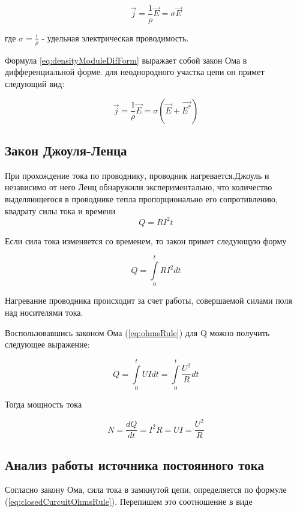 \documentclass[14pt, a4paper, twoside]{extreport}
\begin{document}
\begin{equation}
  \label{eq:densityVectorDifForm}
  \vec{j} = \frac{1}{\rho}\vec{E} = \sigma\vec{E}
\end{equation}

где $\sigma = \frac{1}{\rho}$ - удельная электрическая проводимость.

Формула \ref{eq:densityModuleDifForm} выражает собой закон Ома в дифференциальной форме. для неоднородного участка цепи он примет следующий вид:

\begin{equation}
  \label{eq:densityVectorDifFormInisotropicConductor}
  \vec{j} = \frac{1}{\rho}\vec{E} = \sigma(\vec{E} + \vec{E^\text{*}})
\end{equation}

\subsection{Закон Джоуля-Ленца}

При прохождение тока по проводнику, проводник нагревается.Джоуль и независимо от него Ленц обнаружили экспериментально, что количество выделяющегося в проводнике тепла пропорционально его сопротивлению, квадрату силы тока и времени
\begin{equation}
  \label{eq:djouleLenzRule}
  Q = RI^2t
\end{equation}

Если сила тока изменяется  со временем, то закон примет следующую форму

\begin{equation}
  \label{eq:djouleLenzRuleIntForm}
  Q = \int\limits_{0}^{t}RI^2dt
\end{equation}

Нагревание проводника происходит за счет работы, совершаемой силами поля над носителями тока.

Воспользовавшись законом Ома (\ref{eq:ohmsRule}) для Q можно получить следующее выражение:

\begin{equation}
  \label{eq:djouleLenzRuleUsingOhmsRule}
  Q = \int\limits_{0}^{t}UIdt = \int\limits_{0}^{t}\frac{U^2}{R}dt
\end{equation}

Тогда мощность тока

\begin{equation}
  \label{eq:electricityPower}
  N = \frac{dQ}{dt} = I^2R =  UI = \frac{U^2}{R}
\end{equation}
\subsection{Анализ работы источника постоянного тока}
Согласно закону Ома, сила тока в замкнутой цепи, определяется по формуле (\ref{eq:closedCurcuitOhmsRule}). Перепишем это соотношение в виде
\end{document}
